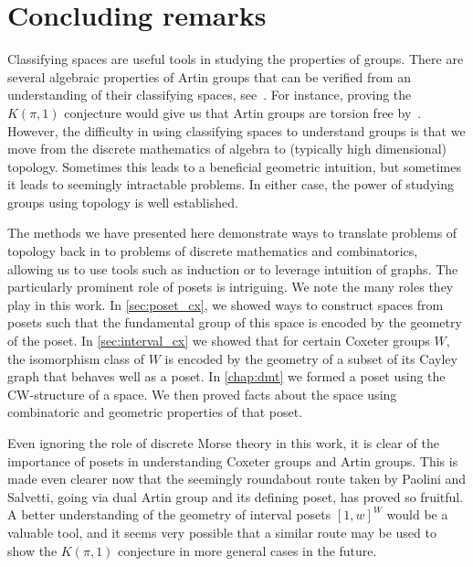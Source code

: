 \documentclass[class=article, crop=false]{standalone}
\begin{document}
\section{Concluding remarks}

Classifying spaces are useful tools in studying the properties of groups. There are several algebraic properties of Artin groups that can be verified from an understanding of their classifying spaces, see~\cite{charney_problems_2008}. For instance, proving the $K(\pi,1)$ conjecture would give us that Artin groups are torsion free by~\cite[Proposition 2.45]{hatcher_algebraic_2001}. However, the difficulty in using classifying spaces to understand groups is that we move from the discrete mathematics of algebra to (typically high dimensional) topology. Sometimes this leads to a beneficial geometric intuition, but sometimes it leads to seemingly intractable problems. In either case, the power of studying groups using topology is well established.

The methods we have presented here demonstrate ways to translate problems of topology back in to problems of discrete mathematics and combinatorics, allowing us to use tools such as induction or to leverage intuition of graphs. 
The particularly prominent role of posets is intriguing. We note the many roles they play in this work. In \cref{sec:poset_cx}, we showed ways to construct spaces from posets such that the fundamental group of this space is encoded by the geometry of the poset. In \cref{sec:interval_cx} we showed that for certain Coxeter groups $W$, the isomorphism class of $W$ is encoded by the geometry of a subset of its Cayley graph that behaves well as a poset. In \cref{chap:dmt} we formed a poset using the CW-structure of a space. We then proved facts about the space using combinatoric and geometric properties of that poset.

Even ignoring the role of discrete Morse theory in this work, it is clear of the importance of posets in understanding Coxeter groups and Artin groups. This is made even clearer now that the seemingly roundabout route taken by Paolini and Salvetti, going via dual Artin group and its defining poset, has proved so fruitful. A better understanding of the geometry of interval posets ${[1,w]}^W$ would be a valuable tool, and it seems very possible that a similar route may be used to show the $K(\pi,1)$ conjecture in more general cases in the future.
\end{document}
